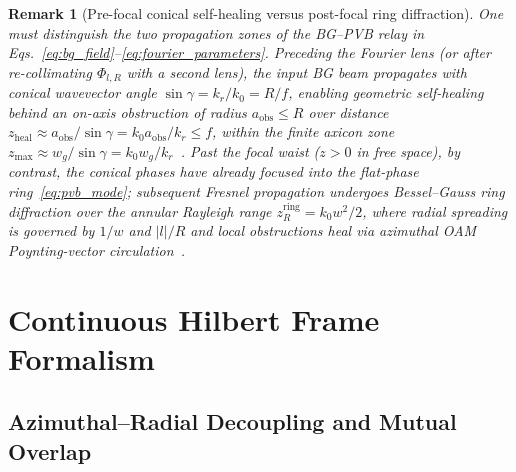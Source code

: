 \documentclass[aps,pra,reprint,amsmath,amssymb,floatfix,longbibliography]{revtex4-2}
\providecommand{\abs}[1]{\lvert#1\rvert}
\newtheorem{remark}{Remark}
\begin{document}
\begin{remark}[Pre-focal conical self-healing versus post-focal ring diffraction]
\label{rem:propagation}
One must distinguish the two propagation zones of the BG--PVB relay in Eqs.~\eqref{eq:bg_field}--\eqref{eq:fourier_parameters}. Preceding the Fourier lens (or after re-collimating $\Phi_{l,R}$ with a second lens), the input BG beam propagates with conical wavevector angle $\sin\gamma = k_r/k_0 = R/f$, enabling geometric self-healing behind an on-axis obstruction of radius $a_{\mathrm{obs}} \le R$ over distance $z_{\mathrm{heal}} \approx a_{\mathrm{obs}}/\sin\gamma = k_0 a_{\mathrm{obs}}/k_r \le f$, within the finite axicon zone $z_{\max} \approx w_g/\sin\gamma = k_0 w_g/k_r$~\cite{Gori1987}. Past the focal waist ($z > 0$ in free space), by contrast, the conical phases have already focused into the flat-phase ring~\eqref{eq:pvb_mode}; subsequent Fresnel propagation undergoes Bessel--Gauss ring diffraction over the annular Rayleigh range $z_R^{\mathrm{ring}} = k_0 w^2/2$, where radial spreading is governed by $1/w$ and $\abs{l}/R$ and local obstructions heal via azimuthal OAM Poynting-vector circulation~\cite{Reddy2016}.
\end{remark}

\section{Continuous Hilbert Frame Formalism}
\label{sec:frame_formalism}

\subsection{Azimuthal--Radial Decoupling and Mutual Overlap}
\label{subsec:overlap_kernel}
\end{document}
